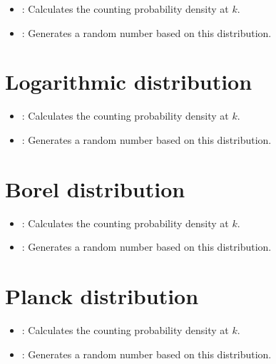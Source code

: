 \begin{itemize}

\item
{}:
Calculates the counting probability density at $k$.

\item
{}:
Generates a random number based on this distribution.

\end{itemize}



\section{Logarithmic distribution}

\begin{itemize}

\item
{}:
Calculates the counting probability density at $k$.

\item
{}:
Generates a random number based on this distribution.

\end{itemize}



\section{Borel distribution}

\begin{itemize}

\item
{}:
Calculates the counting probability density at $k$.

\item
{}:
Generates a random number based on this distribution.

\end{itemize}



\section{Planck distribution}

\begin{itemize}

\item
{}:
Calculates the counting probability density at $k$.

\item
{}:
Generates a random number based on this distribution.

\end{itemize}



